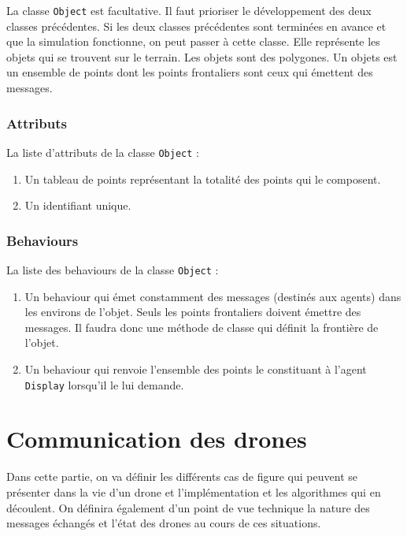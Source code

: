 \documentclass[11pt]{report}
\begin{document}
La classe \verb|Object| est facultative. Il faut prioriser le développement des deux classes précédentes. Si les deux classes précédentes sont terminées en avance et que la simulation fonctionne, on peut passer à cette classe. Elle représente les objets qui se trouvent sur le terrain. Les objets sont des polygones. Un objets est un ensemble de points dont les points frontaliers sont ceux qui émettent des messages.

\subsubsection{Attributs}

La liste d'attributs de la classe \verb|Object| :

\begin{enumerate}
\item Un tableau de points représentant la totalité des points qui le composent.

\item Un identifiant unique.
\end{enumerate}

\subsubsection{Behaviours}

La liste des behaviours de la classe \verb|Object| :

\begin{enumerate}
\item Un behaviour qui émet constamment des messages (destinés aux agents) dans les environs de l'objet. Seuls les points frontaliers doivent émettre des messages. Il faudra donc une méthode de classe qui définit la frontière de l'objet.

\item Un behaviour qui renvoie l'ensemble des points le constituant à l'agent \verb|Display| lorsqu'il le lui demande.
\end{enumerate}

\newpage
\section{Communication des drones}

Dans cette partie, on va définir les différents cas de figure qui peuvent se présenter dans la vie d'un drone et l'implémentation et les algorithmes qui en découlent. On définira également d'un point de vue technique la nature des messages échangés et l'état des drones au cours de ces situations.
\end{document}
